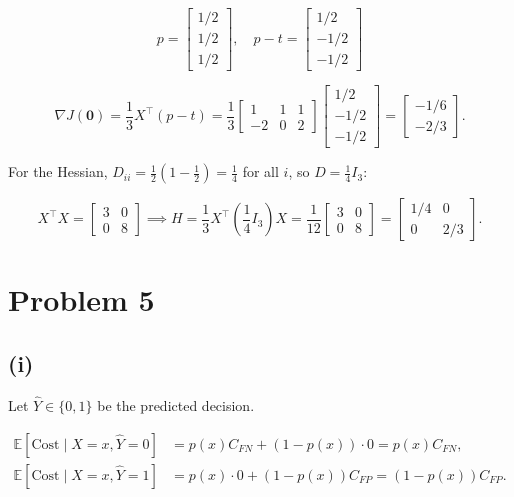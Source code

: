 \documentclass[11pt]{article}
\begin{document}
$$
p = \begin{bmatrix} 1/2 \\ 1/2 \\ 1/2 \end{bmatrix}
, \quad
p - t = \begin{bmatrix} 1/2 \\ -1/2 \\ -1/2 \end{bmatrix}
$$

$$
\nabla J(\mathbf{0})
= \frac{1}{3} X^\top (p - t)
= \frac{1}{3} \begin{bmatrix} 1 & 1 & 1 \\ -2 & 0 & 2 \end{bmatrix} \begin{bmatrix} 1/2 \\ -1/2 \\ -1/2 \end{bmatrix}
= \begin{bmatrix} -1/6 \\ -2/3 \end{bmatrix}.
$$

For the Hessian, $D_{ii} = \frac{1}{2} \left( 1 - \frac{1}{2} \right) = \frac{1}{4}$ for all $i$, so $D = \frac{1}{4} I_3$:

$$
X^\top X = \begin{bmatrix} 3 & 0 \\ 0 & 8 \end{bmatrix} \implies H = \frac{1}{3} X^\top \left(\frac{1}{4} I_3\right) X = \frac{1}{12} \begin{bmatrix} 3 & 0 \\ 0 & 8 \end{bmatrix} = \begin{bmatrix} 1/4 & 0 \\ 0 & 2/3 \end{bmatrix}.
$$

\newpage

\section*{Problem 5}

\subsection*{(i)}

Let $\hat{Y} \in \{0, 1\}$ be the predicted decision.

$$
\begin{aligned}
\mathbb{E}[\text{Cost} \mid X=x, \hat{Y}=0] &= p(x) C_{FN} + (1 - p(x)) \cdot 0 = p(x) C_{FN}, \\
\mathbb{E}[\text{Cost} \mid X=x, \hat{Y}=1] &= p(x) \cdot 0 + (1 - p(x)) C_{FP} = (1 - p(x)) C_{FP}.
\end{aligned}
$$
\end{document}
